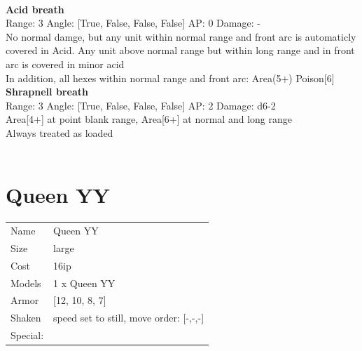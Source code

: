 \ \\
{\bf Acid breath } \\



Range: 3  Angle: [True, False, False, False] AP: 0 Damage: - \\
No normal damge, but any unit within normal range and front arc is automaticly covered in Acid. Any unit above normal range but within long range and in front arc is covered in minor acid\\ 
In addition, all hexes within normal range and front arc: Area(5+) Poison[6]\\ 




{\bf Shrapnell breath } \\



Range: 3  Angle: [True, False, False, False] AP: 2 Damage: d6-2 \\
Area[4+] at point blank range, Area[6+] at normal and long range\\ 
Always treated as loaded\\ 




 
\ \\













\clearpage

\section{ Queen YY }

\begin{tabular}{ll}
  Name & Queen YY \\
  Size & large\\
  Cost & 16ip\\
  Models & 1 x Queen YY\\
  Armor & [12, 10, 8, 7]\\
  Shaken & speed set to still, move order: [-,-,-]\\
  Special: \\
\end{tabular}

\noindent 

